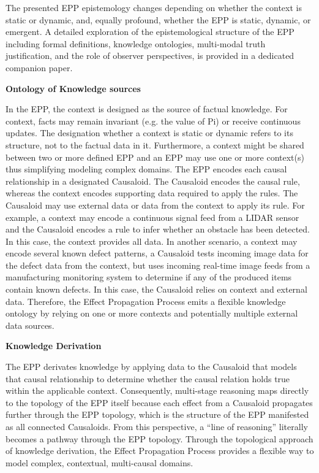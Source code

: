 \documentclass{article}
\begin{document}
The  presented EPP epistemology changes depending on whether the context is static or dynamic, and, equally profound, whether the EPP is static, dynamic, or emergent. A detailed exploration of the epistemological structure of the EPP including formal definitions, knowledge ontologies, multi-modal truth justification, and the role of observer perspectives, is provided in a dedicated companion paper\cite{Hansen2025EPP_Epistemology}. 

\textbf{Ontology of Knowledge sources}

In the EPP, the context is designed as the source of factual knowledge. For context, facts may remain invariant (e.g. the value of Pi) or receive continuous updates. The designation whether a context is static or dynamic refers to its structure, not to the factual data in it. Furthermore, a context might be shared between two or more defined EPP and an EPP may use one or more context(s) thus simplifying modeling complex domains.
The EPP encodes each causal relationship in a designated Causaloid. The Causaloid encodes the causal rule, whereas the context encodes supporting data required to apply the rules. The Causaloid may use external data or data from the context to apply its rule.
For example, a context may encode a continuous signal feed from a LIDAR sensor and the Causaloid encodes a rule to infer whether an obstacle has been detected. In this case, the context provides all data. In another scenario, a context may encode several known defect patterns, a Causaloid tests incoming image data for the defect data from the context, but uses incoming real-time image feeds from a manufacturing monitoring system to determine if any of the produced items contain known defects. In this case, the Causaloid relies on context and external data. Therefore, the Effect Propagation Process emits a flexible knowledge ontology by relying on one or more contexts and potentially multiple external data sources.

\textbf{Knowledge Derivation}

The EPP derivates knowledge by applying data to the Causaloid that models that causal relationship to determine whether the causal relation holds true within the applicable context. Consequently, multi-stage reasoning maps directly to the topology of the EPP itself because each effect from a Causaloid propagates further through the EPP topology, which is the structure of the EPP manifested as all connected Causaloids.
From this perspective, a “line of reasoning” literally becomes a pathway through the EPP topology.
Through the topological approach of knowledge derivation, the Effect Propagation Process provides a flexible way to model complex, contextual, multi-causal domains.
\end{document}
